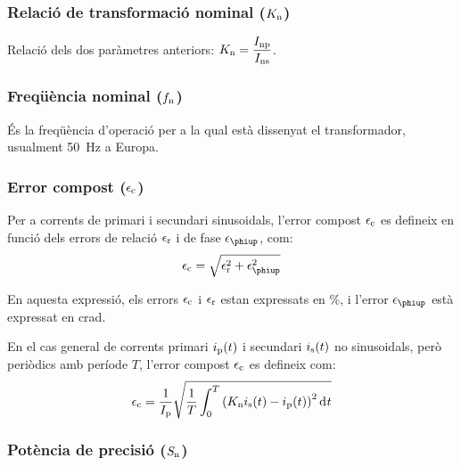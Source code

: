 \subsubsection{Relació de transformació nominal ($K_\mathrm{n}$)}

Relació dels dos  paràmetres anteriors: $K_\mathrm{n} = \dfrac{I_\mathrm{np}}{I_\mathrm{ns}}$.

\subsubsection{Freqüència nominal ($f_\mathrm{n}$)}

 És la freqüència d'operació per a la qual    està dissenyat el transformador, usualment \qty{50}{Hz} a Europa.

\subsubsection{Error compost ($\epsilon_\mathrm{c}$)}

Per a corrents de primari i secundari sinusoidals, l'error compost $\epsilon_\mathrm{c}$ es defineix  en funció dels errors de relació $\epsilon_\mathrm{r}$ i de fase  $\epsilon\ped{\phiup}$, com:
\begin{equation}
    \epsilon\ped{c} = \sqrt{\epsilon\ped{r}^2 +  \epsilon\ped{\phiup}^2}
\end{equation}

En aquesta expressió, els errors $\epsilon_\mathrm{c}$ i $\epsilon_\mathrm{r}$  estan expressats en \si{\percent}, i l'error $\epsilon\ped{\phiup}$ està expressat en crad.

En el cas general de corrents primari $i_\mathrm{p}(t)$ i secundari $i_\mathrm{s}(t)$ no sinusoidals, però periòdics amb període $T$, l'error compost $\epsilon_\mathrm{c}$ es defineix com:
\begin{equation}
    \epsilon\ped{c} = \frac{1}{I\ped{p}} \sqrt{\frac{1}{T} \int_0^T \left(K\ped{n} i\ped{s}(t) - i\ped{p}(t)\right)^2 \diff t}
\end{equation}

\subsubsection{Potència de precisió ($S_\mathrm{n}$)}

